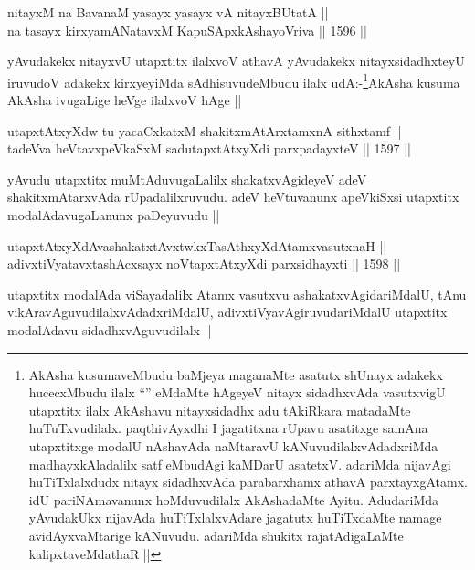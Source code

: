 
\begin{shl}
nitayxM na BavanaM yasayx yasayx vA nitayxBUtatA || \\
na tasayx kirxyamANatavxM KapuSApxkAshayoVriva ||  1596 ||  
\end{shl}

\begin{artha}
yAvudakekx nitayxvU utapxtitx ilalxvoV athavA yAvudakekx nitayxsidadhxteyU iruvudoV adakekx kirxyeyiMda sAdhisuvudeMbudu ilalx udA:-\footnote{AkAsha kusumaveMbudu baMjeya maganaMte asatutx shUnayx adakekx hucecxMbudu ilalx ``\stext'' eMdaMte hAgeyeV nitayx sidadhxvAda vasutxvigU utapxtitx ilalx AkAshavu nitayxsidadhx adu tAkiRkara matadaMte huTuTxvudilalx. paqthivAyxdhi I jagatitxna rUpavu asatitxge samAna utapxtitxge modalU nAshavAda naMtaravU kANuvudilalxvAdadxriMda madhayxkAladalilx satf eMbudAgi kaMDarU asatetxV. \stext adariMda nijavAgi huTiTxlalxdudx nitayx sidadhxvAda parabarxhamx athavA parxtayxgAtamx. idU pariNAmavanunx hoMduvudilalx AkAshadaMte Ayitu. AdudariMda yAvudakUkx nijavAda huTiTxlalxvAdare jagatutx huTiTxdaMte namage avidAyxvaMtarige kANuvudu. adariMda shukitx rajatAdigaLaMte kalipxtaveMdathaR ||}AkAsha kusuma AkAsha ivugaLige heVge ilalxvoV hAge ||
\end{artha}

\begin{shl}
utapxtAtxyXdw tu yacaCxkatxM shakitxmAtArxtamxnA sithxtamf || \\
tadeVva heVtavxpeVkaSxM sadutapxtAtxyXdi parxpadayxteV ||  1597 ||  
\end{shl}

\begin{artha}
yAvudu utapxtitx muMtAduvugaLalilx shakatxvAgideyeV adeV shakitxmAtarxvAda rUpadalilxruvudu. adeV heVtuvanunx apeVkiSxsi utapxtitx modalAdavugaLanunx paDeyuvudu ||
\end{artha}

\begin{shl}
utapxtAtxyXdAvashakatxtAvxtwkxTasAthxyXdAtamxvasutxnaH || \\
adivxtiVyatavxtashAcxsayx noVtapxtAtxyXdi parxsidhayxti ||  1598 ||  
\end{shl}

\begin{artha}
utapxtitx modalAda viSayadalilx Atamx vasutxvu ashakatxvAgidariMdalU, tAnu vikAravAguvudilalxvAdadxriMdalU, adivxtiVyavAgiruvudariMdalU utapxtitx modalAdavu sidadhxvAguvudilalx ||
\end{artha}

